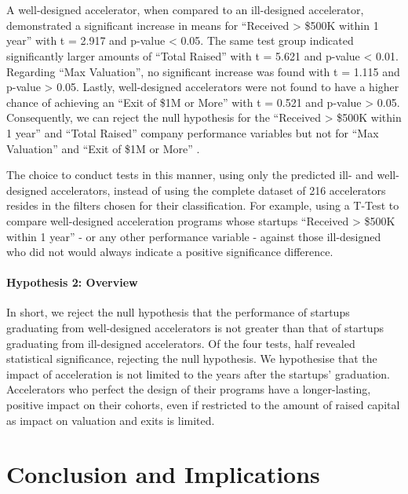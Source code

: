 \documentclass[
  12pt,
]{article}
\begin{document}
~

~

A well-designed accelerator, when compared to an ill-designed accelerator, demonstrated a significant increase in means for ``Received \textgreater{} \$500K within 1 year'' with t = 2.917 and p-value \textless{} 0.05. The same test group indicated significantly larger amounts of ``Total Raised'' with t = 5.621 and p-value \textless{} 0.01. Regarding ``Max Valuation'', no significant increase was found with t = 1.115 and p-value \textgreater{} 0.05. Lastly, well-designed accelerators were not found to have a higher chance of achieving an ``Exit of \$1M or More'' with t = 0.521 and p-value \textgreater{} 0.05. Consequently, we can reject the null hypothesis for the ``Received \textgreater{} \$500K within 1 year'' and ``Total Raised'' company performance variables but not for ``Max Valuation'' and ``Exit of \$1M or More'' .

The choice to conduct tests in this manner, using only the predicted ill- and well-designed accelerators, instead of using the complete dataset of 216 accelerators resides in the filters chosen for their classification. For example, using a T-Test to compare well-designed acceleration programs whose startups ``Received \textgreater{} \$500K within 1 year'' - or any other performance variable - against those ill-designed who did not would always indicate a positive significance difference.

\hypertarget{hypothesis-2-overview}{%
\paragraph{Hypothesis 2: Overview}\label{hypothesis-2-overview}}

In short, we reject the null hypothesis that the performance of startups graduating from well-designed accelerators is not greater than that of startups graduating from ill-designed accelerators. Of the four tests, half revealed statistical significance, rejecting the null hypothesis. We hypothesise that the impact of acceleration is not limited to the years after the startups' graduation. Accelerators who perfect the design of their programs have a longer-lasting, positive impact on their cohorts, even if restricted to the amount of raised capital as impact on valuation and exits is limited.

\clearpage

\hypertarget{conclusion-and-implications}{%
\section{Conclusion and Implications}\label{conclusion-and-implications}}
\end{document}
